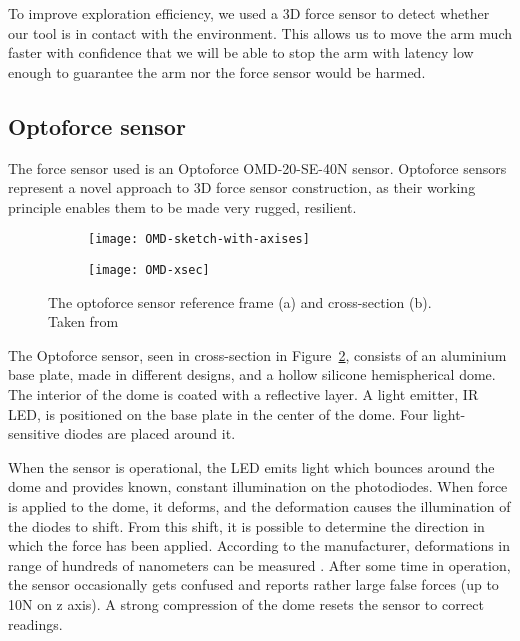 \documentclass[buriama8_dp.tex]{subfiles}
\begin{document}
To improve exploration efficiency, we used a 3D force sensor to detect whether our tool is in contact with the environment. This allows us to move the arm much faster with confidence that we will be able to stop the arm with latency low enough to guarantee the arm nor the force sensor would be harmed.

\subsection{Optoforce sensor}
\label{subsec:opto}

The force sensor used is an Optoforce OMD-20-SE-40N sensor. Optoforce sensors represent a novel approach to 3D force sensor construction, as their working principle enables them to be made very rugged, resilient.

\begin{figure}[ht]
  \begin{subfigure}[t]{0.4\textwidth}
    \texttt{[image: OMD-sketch-with-axises]}
    \caption{}
    \label{fig:omd_geom}
  \end{subfigure}
  \begin{subfigure}[t]{0.4\textwidth}
    \texttt{[image: OMD-xsec]}
    \caption{}
    \label{fig:omd_xsec}
  \end{subfigure}

  \caption[Optoforce sensor]{The optoforce sensor reference frame (a) and cross-section (b). Taken from \cite{opto_whitep}}
  \label{fig:decomps}
\end{figure}

The Optoforce sensor, seen in cross-section in Figure~\ref{fig:omd_xsec}, consists of an aluminium base plate, made in different designs, and a hollow silicone hemispherical dome. The interior of the dome is coated with a reflective layer. A light emitter, IR LED, is positioned on the base plate in the center of the dome. Four light-sensitive diodes are placed around it.

When the sensor is operational, the LED emits light which bounces around the dome and provides known, constant illumination on the photodiodes. When force is applied to the dome, it deforms, and the deformation causes the illumination of the diodes to shift. From this shift, it is possible to determine the direction in which the force has been applied. According to the manufacturer, deformations in range of hundreds of nanometers can be measured \cite{opto_whitep}. After some time in operation, the sensor occasionally gets confused and reports rather large false forces (up to 10N on z axis). A strong compression of the dome resets the sensor to correct readings.
\end{document}

